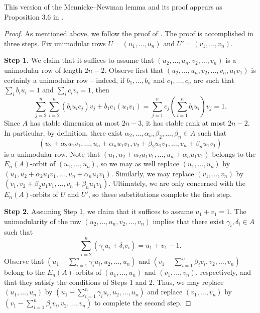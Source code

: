 This version of the Mennicke--Newman lemma and its proof appears as Proposition 3.6 in \cite{Lerbet}.

\begin{proof}
    As mentioned above, we follow the proof of \cite[Proposition 3.6]{Lerbet}. The proof is accomplished in three steps. Fix unimodular rows $U = (u_1,\ldots,u_n)$ and $U' = (v_1,\ldots,v_n)$.

    \textbf{Step 1.} We claim that it suffices to assume that $(u_2,\ldots,u_n,v_2,\ldots,v_n)$ is a unimodular row of length $2n-2$. Observe first that $(u_2,\ldots,u_n,v_2,\ldots,v_n, u_1v_1)$ is certainly a unimodular row -- indeed, if $b_1,\ldots,b_n$ and $c_1,\ldots,c_n$ are such that $\sum_i b_iu_i = 1$ and $\sum_i c_iv_i = 1$, then \[\sum_{j=2}^n \sum_{i=2}^n (b_iu_ic_j)v_j + b_1c_1(u_1v_1)= \sum_{j=1}^n c_j\left(\sum_{i=1}^n b_iu_i\right)v_j =1. \]
    Since $A$ has stable dimension at most $2n-3$, it has stable rank at most $2n-2$. In particular, by definition, there exist $\alpha_2,\ldots,\alpha_n,\beta_2,\ldots,\beta_n \in A$ such that
    \[
    (u_2+\alpha_2u_1v_1, \ldots,u_n+\alpha_nu_1v_1,v_2+\beta_2u_1v_1,\ldots,v_n + \beta_nu_1v_1)
    \]
    is a unimodular row. Note that $(u_1,u_2+\alpha_2u_1v_1, \ldots,u_n+\alpha_nu_1v_1)$ belongs to the $E_n(A)$-orbit of $(u_1,\ldots,u_n)$, so we may as well replace $(u_1,\ldots,u_n)$ by $(u_1,u_2+\alpha_2u_1v_1, \ldots,u_n+\alpha_nu_1v_1)$. Similarly, we may replace $(v_1,\ldots,v_n)$ by $(v_1,v_2+\beta_2u_1v_1,\ldots,v_n + \beta_nu_1v_1)$. Ultimately, we are only concerned with the $E_n(A)$-orbits of $U$ and $U'$, so these substitutions complete the first step. 

    \textbf{Step 2.} Assuming Step 1, we claim that it suffices to assume $u_1 + v_1 = 1$. The unimodularity of the row $(u_2,\ldots,u_n,v_2,\ldots,v_n)$ implies that there exist $\gamma_i,\delta_i \in A$ such that
    \[
    \sum_{i=2}^n (\gamma_iu_i + \delta_iv_i) = u_1 + v_1 - 1.
    \]
    Observe that $\left(u_1-\sum_{i=1}^n\gamma_iu_i, u_2,\ldots,u_n\right)$ and $\left(v_1-\sum_{i=1}^n\beta_iv_i, v_2,\ldots,v_n\right)$ belong to the $E_n(A)$-orbits of $(u_1,\ldots,u_n)$ and $(v_1,\ldots,v_n)$, respectively, and that they satisfy the conditions of Steps 1 and 2. Thus, we may replace $(u_1,\ldots,u_n)$ by $\left(u_1-\sum_{i=1}^n\gamma_iu_i, u_2,\ldots,u_n\right)$ and replace $(v_1,\ldots,v_n)$ by $\left(v_1-\sum_{i=1}^n\beta_iv_i, v_2,\ldots,v_n\right)$ to complete the second step. 


\end{proof}
